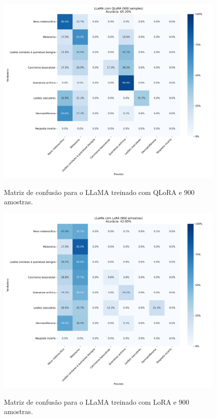 \begin{figure}[ht]
    \centering
    \caption{\small Matriz de confusão para o \ac{LLaMA} treinado com \ac{QLoRA} e 900 amostras.}
    \includegraphics[width=1\columnwidth,keepaspectratio]{images/confusion_matrix_qlora_900.png}
    \label{fig:confusion_matrix_qlora_900}
\end{figure}

\clearpage

\begin{figure}[ht]
    \centering
    \caption{\small Matriz de confusão para o \ac{LLaMA} treinado com \ac{LoRA} e 900 amostras.}
    \includegraphics[width=1\columnwidth,keepaspectratio]{images/confusion_matrix_lora_900.png}
    \label{fig:confusion_matrix_lora_900}
\end{figure}

